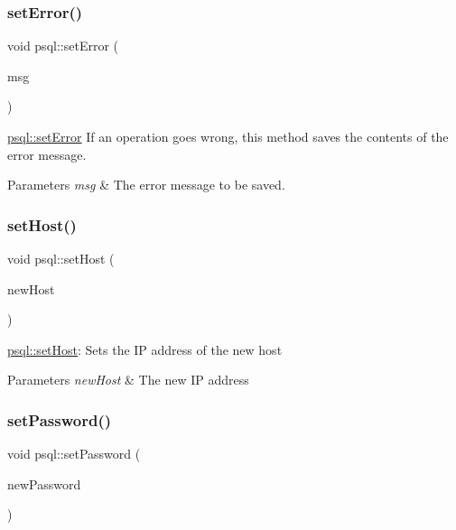\subsubsection{\texorpdfstring{set\+Error()}{setError()}}
{\footnotesize\ttfamily void psql\+::set\+Error (\begin{DoxyParamCaption}\item[{Q\+String}]{msg }\end{DoxyParamCaption})}



\mbox{\hyperlink{classpsql_a9a0d5ba32aabe6018a36fb0bc185445b}{psql\+::set\+Error}} If an operation goes wrong, this method saves the contents of the error message. 


\begin{DoxyParams}{Parameters}
{\em msg} & The error message to be saved. \\
\hline
\end{DoxyParams}
\mbox{\label{classpsql_a96b3b9483f1a642c026d4b5cf505eb75}} 
\subsubsection{\texorpdfstring{set\+Host()}{setHost()}}
{\footnotesize\ttfamily void psql\+::set\+Host (\begin{DoxyParamCaption}\item[{Q\+String}]{new\+Host }\end{DoxyParamCaption})}



\mbox{\hyperlink{classpsql_a96b3b9483f1a642c026d4b5cf505eb75}{psql\+::set\+Host}}\+: Sets the IP address of the new host 


\begin{DoxyParams}{Parameters}
{\em new\+Host} & The new IP address \\
\hline
\end{DoxyParams}
\mbox{\label{classpsql_a6c29350037550b7e5a5bb8f439c405f3}} 
\subsubsection{\texorpdfstring{set\+Password()}{setPassword()}}
{\footnotesize\ttfamily void psql\+::set\+Password (\begin{DoxyParamCaption}\item[{Q\+String}]{new\+Password }\end{DoxyParamCaption})}



